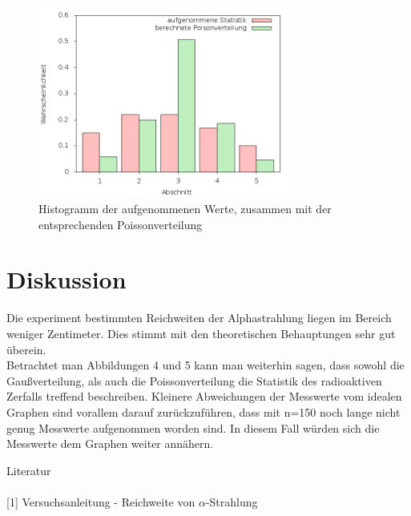 \begin{figure}[H]
\includegraphics[width=0.75\textwidth]{pics/poisson.png}
\caption{Histogramm der aufgenommenen Werte, zusammen mit der entsprechenden Poissonverteilung}
\end{figure}

\section{Diskussion}
Die experiment bestimmten Reichweiten der Alphastrahlung liegen im Bereich weniger Zentimeter. Dies stimmt mit den theoretischen Behauptungen sehr gut überein.\\

Betrachtet man Abbildungen 4 und 5 kann man weiterhin sagen, dass sowohl die Gaußverteilung, als auch die Poissonverteilung die Statistik des radioaktiven Zerfalls treffend beschreiben. Kleinere Abweichungen der Messwerte vom idealen Graphen sind vorallem darauf zurückzuführen, dass mit n=150 noch lange nicht genug Messwerte aufgenommen worden sind. In diesem Fall würden sich die Messwerte dem Graphen weiter annähern.


\parskip 380pt
\Large{Literatur}\\\\
\large{[1] Versuchsanleitung - Reichweite von $\alpha$-Strahlung}\\\\




